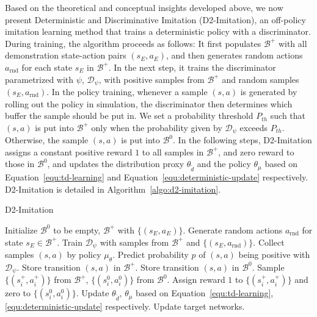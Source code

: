 \documentclass[letterpaper]{article} %
\begin{document}
Based on the theoretical and conceptual insights developed above,
we now present Deterministic and Discriminative Imitation (D2-Imitation),
an off-policy imitation learning method that trains a deterministic policy with a discriminator.
During training, the algorithm proceeds as follows:
It first populates $\mathcal{B}^{+}$ with all demonstration state-action pairs $(s_E, a_E)$,
and then generates random actions $a_{\text{rnd}}$ for each state $s_E$ in $\mathcal{B}^{+}$.
In the next step, it trains the discriminator parametrized with $\psi$, $\mathcal{D}_{\psi}$, with positive samples from $\mathcal{B}^{+}$ and random samples $(s_E, a_{\text{rnd}})$.
In the policy training,
whenever a sample $(s, a)$ is generated by rolling out the policy in simulation,
the discriminator then determines which buffer the sample should be put in.
We set a probability threshold $P_{th}$ such that $(s, a)$ is put into $\mathcal{B}^{+}$ only when the probability given by $\mathcal{D}_{\psi}$ exceeds $P_{th}$.
Otherwise, the sample $(s, a)$ is put into $\mathcal{B}^{0}$.
In the following steps, D2-Imitation assigns a constant positive reward $1$ to all samples in $\mathcal{B}^{+}$,
and zero reward to those in $\mathcal{B}^{0}$,
and updates the distribution proxy $\theta_{\tilde{d}}$ and the policy $\theta_{\mu}$ based on Equation~\eqref{equ:td-learning} and Equation~\eqref{equ:deterministic-update} respectively.
D2-Imitation is detailed in Algorithm~\ref{algo:d2-imitation}.

\begin{algorithm}[tb]
\caption{D2-Imitation}\label{algo:d2-imitation}
\begin{algorithmic}[1] %
\STATE Initialize $\mathcal{B}^{0}$ to be empty, $\mathcal{B}^{+}$ with $\{(s_{E}, a_{E}) \}$.
\STATE Generate random actions $a_{\text{rnd}}$ for state $s_E\in\mathcal{B}^{+}$.
\STATE Train $\mathcal{D}_{\psi}$ with samples from $\mathcal{B}^{+}$ and $\{(s_{E}, a_{\text{rnd}})\}$.
\STATE Collect samples $(s, a)$ by policy $\mu_\theta$.
\STATE Predict probability $p$ of $(s, a)$ being positive with $\mathcal{D}_{\psi}$.
\STATE Store transition $(s, a)$ in $\mathcal{B}^{+}$.
\ELSE
\STATE Store transition $(s, a)$ in $\mathcal{B}^{0}$.
\ENDIF
\STATE Sample $\{(s_i^+, a_i^+)\}$ from $\mathcal{B}^{+}$, $\{(s_i^0, a_i^0)\}$ from $\mathcal{B}^{0}$.
\STATE Assign reward $1$ to $\{(s_i^+, a_i^+) \}$ and zero to $\{(s_i^0, a_i^0) \}$.
\STATE Update $\theta_{\tilde{d}}$, $\theta_{\mu}$ based on Equation~\eqref{equ:td-learning}, \eqref{equ:deterministic-update} respectively.
\STATE Update target networks.
\ENDIF
\ENDFOR
\end{algorithmic}
\end{algorithm}
\end{document}
